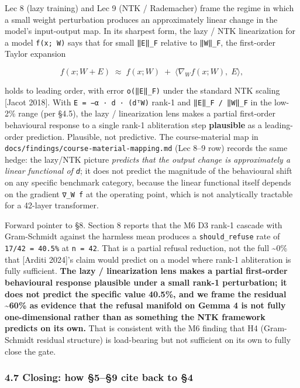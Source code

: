 \documentclass[
  11pt,
]{article}
\begin{document}
Lec 8 (lazy training) and Lec 9 (NTK / Rademacher) frame the regime in
which a small weight perturbation produces an approximately linear
change in the model's input-output map. In its sharpest form, the lazy /
NTK linearization for a model \texttt{f(x;\ W)} says that for small
\texttt{‖E‖\_F} relative to \texttt{‖W‖\_F}, the first-order Taylor
expansion

\[ f(x; W + E) \;\approx\; f(x; W) \;+\; \big\langle \nabla_{W} f(x; W), \; E \big\rangle, \]

holds to leading order, with error \texttt{o(‖E‖\_F)} under the standard
NTK scaling {[}Jacot 2018{]}. With \texttt{E\ =\ −α\ ·\ d\ ·\ (dᵀW)}
rank-1 and \texttt{‖E‖\_F\ /\ ‖W‖\_F} in the low-2\% range (per §4.5),
the lazy / linearization lens makes a partial first-order behavioural
response to a single rank-1 abliteration step \textbf{plausible} as a
leading-order prediction. Plausible, not predictive. The course-material
map in \texttt{docs/findings/course-material-mapping.md} (Lec 8--9 row)
records the same hedge: the lazy/NTK picture \emph{predicts that the
output change is approximately a linear functional of \texttt{d}}; it
does not predict the magnitude of the behavioural shift on any specific
benchmark category, because the linear functional itself depends on the
gradient \texttt{∇\_W\ f} at the operating point, which is not
analytically tractable for a 42-layer transformer.

Forward pointer to §8. Section 8 reports that the M6 D3 rank-1 cascade
with Gram-Schmidt against the harmless mean produces a
\texttt{should\_refuse} rate of \texttt{17/42\ =\ 40.5\%} at
\texttt{n\ =\ 42}. That is a partial refusal reduction, not the full
\textasciitilde0\% that {[}Arditi 2024{]}'s claim would predict on a
model where rank-1 abliteration is fully sufficient. \textbf{The lazy /
linearization lens makes a partial first-order behavioural response
plausible under a small rank-1 perturbation; it does not predict the
specific value 40.5\%, and we frame the residual \textasciitilde60\% as
evidence that the refusal manifold on Gemma 4 is not fully
one-dimensional rather than as something the NTK framework predicts on
its own.} That is consistent with the M6 finding that H4 (Gram-Schmidt
residual structure) is load-bearing but not sufficient on its own to
fully close the gate.

\subsubsection{4.7 Closing: how §5--§9 cite back to
§4}\label{closing-how-59-cite-back-to-4}
\end{document}
